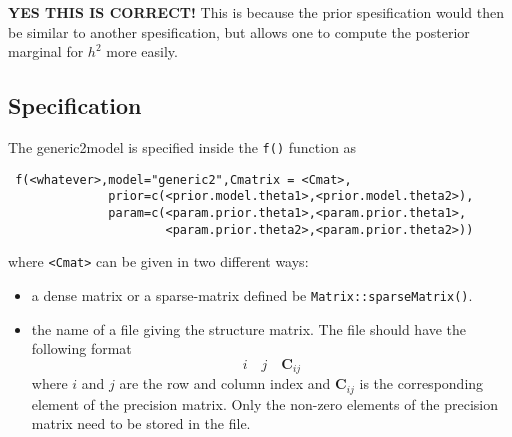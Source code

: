 \documentclass[a4paper,11pt]{article}
\begin{document}
\textbf{YES THIS IS CORRECT!} This is because the prior spesification
would then be similar to another spesification, but allows one to
compute the posterior marginal for $h^{2}$ more easily.

\subsection*{Specification}

The generic2model is specified inside the {\tt f()} function as
\begin{verbatim}
 f(<whatever>,model="generic2",Cmatrix = <Cmat>,
              prior=c(<prior.model.theta1>,<prior.model.theta2>),
              param=c(<param.prior.theta1>,<param.prior.theta1>,
                      <param.prior.theta2>,<param.prior.theta2>))
\end{verbatim}
where {\tt <Cmat>} can be given in two different ways:
\begin{itemize}
\item a dense matrix or a sparse-matrix defined be
    \texttt{Matrix::sparseMatrix()}.
\item the name of a file giving the structure matrix. The file should
    have the following format
    \[
    i\quad j\quad \mathbf{C}_{ij}
    \]
    where $i$ and $j$ are the row and column index and
    $\mathbf{C}_{ij}$ is the corresponding element of the precision
    matrix. Only the non-zero elements of the precision matrix need to
    be stored in the file.
\end{itemize}
\end{document}
